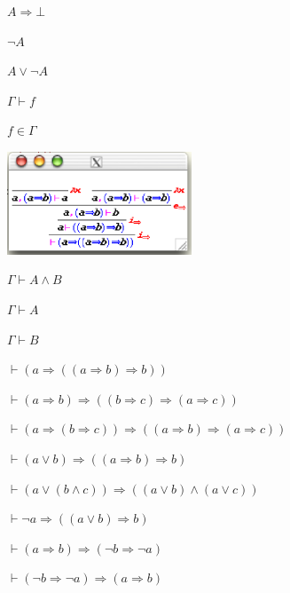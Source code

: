 \documentclass{article}
\begin{document}
$A\Rightarrow\bot$

\clearpage%

$\neg A$

\clearpage%

$A\vee\neg A$

\clearpage%

$\Gamma\vdash f$

\clearpage%

$f\in\Gamma$

\clearpage%
\includegraphics[width=5.5cm]{exemple1.ps}
\clearpage%

$\Gamma\vdash A\wedge B$

\clearpage%

$\Gamma\vdash A$

\clearpage%

$\Gamma\vdash B$

\clearpage%

$\vdash (a\Rightarrow ((a\Rightarrow b) \Rightarrow b))$

\clearpage%

$\vdash (a\Rightarrow b) \Rightarrow ((b\Rightarrow c)\Rightarrow (a\Rightarrow c))$

\clearpage%

$\vdash (a\Rightarrow(b\Rightarrow c)) \Rightarrow ((a\Rightarrow b)\Rightarrow (a\Rightarrow c))$

\clearpage%

$\vdash (a\vee b) \Rightarrow ((a\Rightarrow b)\Rightarrow b)$

\clearpage%

$\vdash (a\vee(b\wedge c))\Rightarrow((a\vee b)\wedge(a\vee c))$

\clearpage%

$\vdash \neg a \Rightarrow ((a\vee b)\Rightarrow b)$

\clearpage%

$\vdash (a \Rightarrow b) \Rightarrow (\neg b\Rightarrow \neg a)$

\clearpage%

$\vdash (\neg b\Rightarrow \neg a) \Rightarrow (a \Rightarrow b)$
\end{document}

